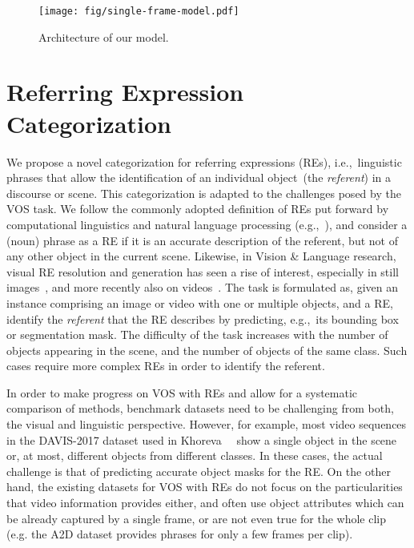 \documentclass[10pt,twocolumn,letterpaper]{article}
\begin{document}
\begin{figure*}
\centering
  \texttt{[image: fig/single-frame-model.pdf]}
\caption{Architecture of our model.}
  \label{fig:single-frame-model}
\end{figure*}








\section{Referring Expression Categorization}
\label{sec:refexps}


We propose a novel categorization for referring expressions (REs), i.e.,~linguistic phrases that allow the identification of an individual object~(the \textsl{referent}) in a discourse or scene. This categorization is adapted to the challenges posed by the VOS task.
We follow the commonly adopted definition of REs put forward by computational linguistics and natural language processing (e.g.,~\cite{reiter1992fast}), and consider a (noun) phrase as a RE if it is an accurate description of the referent, but not of any other object in the current scene.  Likewise, in Vision \& Language research, visual RE resolution and generation has seen a rise of interest, especially in still images~\cite{cirik2018using,mao2015generation,liu2017referring,yu2016joint,nagaraja16refexpcontext}, and more recently also on videos~\cite{anayurt2019,chen2018real}. 
The task is formulated as, given an instance comprising an image or video with one or multiple objects, and a RE, identify the \textit{referent} that the RE describes by predicting, e.g.,~its bounding box or segmentation mask. 
The difficulty of the task increases with the number of objects appearing in the scene, and the number of objects of the same class. 
Such cases require more complex REs in order to identify the referent. 

In order to make progress on VOS with REs and allow for a systematic comparison of methods, benchmark datasets need to be challenging from both, the visual and linguistic perspective. 
However, for example, most video sequences in the DAVIS-2017 dataset used in Khoreva~\etal~\cite{khoreva2018video} show a single object in the scene or, at most, different objects from different classes. In these cases, the actual challenge is that of predicting accurate object masks for the RE. On the other hand, the existing datasets for VOS with REs do not focus on the particularities that video information provides either, and often use object attributes which can be already captured by a single frame, or are not even true for the whole clip (e.g. the A2D dataset provides phrases for only a few frames per clip). 
\end{document}
